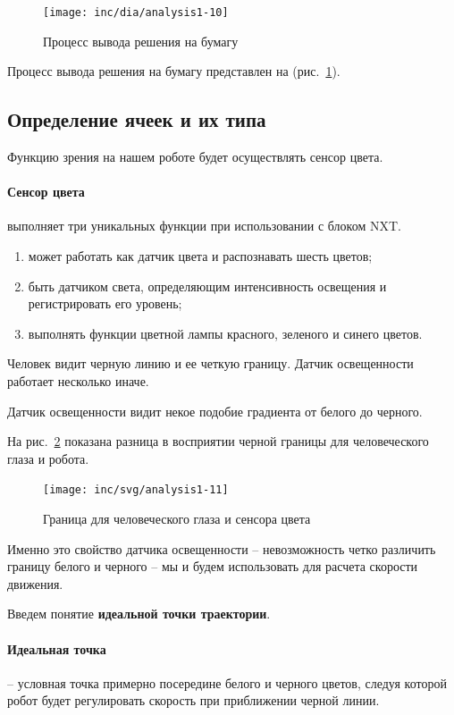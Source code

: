 \begin{figure}[ht]
  \centering
  \texttt{[image: inc/dia/analysis1-10]}
  \caption{Процесс вывода решения на бумагу}
  \label{fig:fig10}
\end{figure}

Процесс вывода решения на бумагу представлен на (рис.~\ref{fig:fig10}).

\subsection{Определение ячеек и их типа}

Функцию зрения на нашем роботе будет осуществлять сенсор цвета.

\paragraph{Сенсор цвета} выполняет три уникальных функции при использовании с блоком NXT.

\begin{enumerate}
  \item может работать как датчик цвета и распознавать шесть цветов;
  \item быть датчиком света, определяющим интенсивность освещения и регистрировать его уровень;
  \item выполнять функции цветной лампы красного, зеленого и синего цветов.
\end{enumerate}

Человек видит черную линию и ее четкую границу. Датчик освещенности работает несколько иначе.

Датчик освещенности видит некое подобие градиента от белого до черного. 

На рис.~\ref{fig:fig11} показана разница в восприятии черной границы для человеческого глаза и робота.

\begin{figure}
  \centering
  \texttt{[image: inc/svg/analysis1-11]}
  \caption{Граница для человеческого глаза и сенсора цвета}
  \label{fig:fig11}
\end{figure}

Именно это свойство датчика освещенности – невозможность четко различить границу белого и черного – мы и будем использовать для расчета скорости движения.

Введем понятие \textbf{идеальной точки траектории}.

\paragraph{Идеальная точка} – условная точка примерно посередине белого и черного цветов, следуя которой робот будет регулировать скорость при приближении черной линии.

